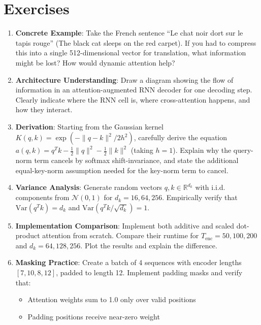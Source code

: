 \documentclass{article}
\begin{document}
\section{Exercises}

\begin{enumerate}
    \item \textbf{Concrete Example}: Take the French sentence ``Le chat noir dort sur le tapis rouge'' (The black cat sleeps on the red carpet). If you had to compress this into a single 512-dimensional vector for translation, what information might be lost? How would dynamic attention help?
    
    \item \textbf{Architecture Understanding}: Draw a diagram showing the flow of information in an attention-augmented RNN decoder for one decoding step. Clearly indicate where the RNN cell is, where cross-attention happens, and how they interact.
    
    \item \textbf{Derivation}: Starting from the Gaussian kernel $K(q, k) = \exp(-\|q - k\|^2 / 2h^2)$, carefully derive the equation $a(q, k) = q^T k - \frac{1}{2}\|q\|^2 - \frac{1}{2}\|k\|^2$ (taking $h=1$). Explain why the query-norm term cancels by softmax shift-invariance, and state the additional equal-key-norm assumption needed for the key-norm term to cancel.
    
    \item \textbf{Variance Analysis}: Generate random vectors $q, k \in \mathbb{R}^{d_k}$ with i.i.d. components from $\mathcal{N}(0, 1)$ for $d_k = 16, 64, 256$. Empirically verify that $\text{Var}(q^T k) = d_k$ and $\text{Var}(q^T k / \sqrt{d_k}) = 1$.
    
    \item \textbf{Implementation Comparison}: Implement both additive and scaled dot-product attention from scratch. Compare their runtime for $T_{\text{enc}} = 50, 100, 200$ and $d_k = 64, 128, 256$. Plot the results and explain the difference.
    
    \item \textbf{Masking Practice}: Create a batch of 4 sequences with encoder lengths $[7, 10, 8, 12]$, padded to length 12. Implement padding masks and verify that:
    \begin{itemize}
        \item Attention weights sum to 1.0 only over valid positions
        \item Padding positions receive near-zero weight
    \end{itemize}
    

\end{enumerate}
\end{document}

